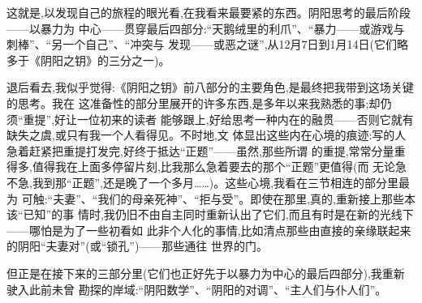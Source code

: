 
这就是,以发现自己的旅程的眼光看,在我看来最要紧的东西。阴阳思考的最后阶段——以暴力为
中心——贯穿最后四部分:“天鹅绒里的利爪”、“暴力——或游戏与刺棒”、“另一个自己”、“冲突与
发现——或恶之谜”,从12月7日到1月14日(它们略多于《阴阳之钥》的三分之一)。

退后看去,我似乎觉得:《阴阳之钥》前八部分的主要角色,是最终把我带到这场关键的思考。我在
这准备性的部分里展开的许多东西,是多年以来我熟悉的事;却仍须“重提”,好让一位初来的读者
能够跟上,好给思考一种内在的融贯——否则它就有缺失之虞,或只有我一个人看得见。不时地,文
体显出这些内在心境的痕迹:写的人急着赶紧把重提打发完,好终于抵达“正题”——虽然,那些所谓
的重提,常常分量重得多,值得我在上面多停留片刻,比我那么急着要去的那个“正题”更值得(而
无论急不急,我到那“正题”,还是晚了一个多月……)。这些心境,我看在三节相连的部分里最为
可触:“夫妻”、“我们的母亲死神”、“拒与受”。即使在那里,真的,重新接上那些本该“已知”的事
情时,我仍旧不由自主同时重新认出了它们,而且有时是在新的光线下——哪怕是为了一些初看如
此非个人化的事情,比如清点那些由直接的亲缘联起来的阴阳“夫妻对”(或“锁孔”)——那些通往
世界的门。

但正是在接下来的三部分里(它们也正好先于以暴力为中心的最后四部分),我\dmark{}重新驶入此前未曾
勘探的岸域:“阴阳数学”、“阴阳的对调”、“主人们与仆人们”。

